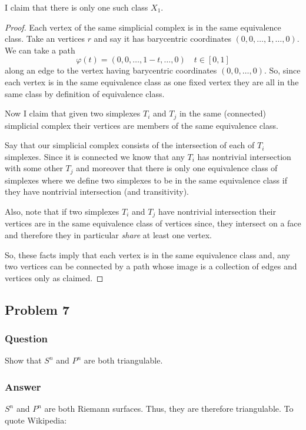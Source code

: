 \documentclass[10pt]{article}
\begin{document}
I claim that there is only one such class $X_1$.

\begin{proof}
Each vertex of the same simplicial complex is in the same equivalence class. Take an vertices $r$ and  say it has barycentric coordinates $(0,0,\dots,1,\dots,0)$. We can take a path 
\[ \varphi(t) =(0,0,\dots,1-t,\dots,0) \quad t\in [0,1]\]
along an edge to the vertex having barycentric coordinates $(0,0,\dots,0)$. So, since each vertex is in the same equivalence class as one fixed vertex they are all in the same class by definition of equivalence class.

Now I claim that given two simplexes $T_i$ and $T_j$ in the same (connected) simplicial complex their vertices are members of the same equivalence class. 

Say that our simplicial complex consists of the intersection of each of $T_i$ simplexes. Since it is connected we know that any $T_i$ has nontrivial intersection with some other $T_j$ and moreover that there is only one equivalence class of simplexes where we define two simplexes to be in the same equivalence class if they have nontrivial intersection (and transitivity). 

Also, note that if two simplexes $T_i$ and $T_j$ have nontrivial intersection their vertices are in the same equivalence class of vertices since, they intersect on a face and therefore they in particular \emph{share} at least one vertex.

So, these facts imply that each vertex is in the same equivalence class and, any two vertices can be connected by a path whose image is a collection of edges and vertices only as claimed.
\end{proof}

\subsection{Problem 7}

\subsubsection{Question}
Show that $S^n$ and $P^n$ are both triangulable.
\subsubsection{Answer}
$S^n$ and $P^n$ are both Riemann surfaces. Thus, they are therefore triangulable. To quote Wikipedia:
\end{document}

